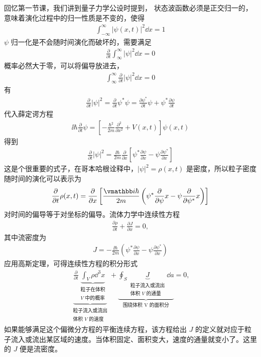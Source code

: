 回忆第一节课，我们讲到量子力学公设时提到，
状态波函数必须是正交归一的，意味着演化过程中的归一性质是不变的，使得
\begin{eqnarray}
    \int_{-\infty}^\infty |\psi(x,t)|^2 \dd x = 1
\end{eqnarray}
$\psi$ 归一化是不会随时间演化而破坏的，需要满足
\begin{eqnarray}
    \frac{\partial}{\partial t} \int_{\infty}^\infty |\psi|^2 \dd x = 0
\end{eqnarray}
概率必然大于零，可以将偏导放进去，
\begin{eqnarray}
    \int_{\infty}^\infty \frac{\partial}{\partial t}  |\psi|^2 \dd x = 0
\end{eqnarray}
有
\begin{eqnarray}
    \frac{\partial}{\partial t} |\psi|^2 = \frac{\partial}{\partial t} \psi^* \psi = \frac{\partial \psi^*}{\partial t}\psi + \psi^* \frac{\partial \psi}{\partial t}
\end{eqnarray}
代入薛定谔方程
\begin{eqnarray}
    \ii\hbar \frac{\partial}{\partial t} \psi = \left[
        -\frac{\hbar^2}{2m} \frac{\partial^2}{\partial x^2} + V(x,t)
    \right]
    \psi(x,t)
\end{eqnarray}
得到
\begin{eqnarray}
    \frac{\partial}{\partial t} |\psi|^2 = \frac{\ii\hbar}{2m} \frac{\partial}{\partial x}
    \left[
        \psi^* \frac{\partial \psi}{\partial x} - \psi \frac{\partial \psi^*}{\partial x}
    \right]
\end{eqnarray}
这是个很重要的式子，在哥本哈根诠释中，$|\psi|^2 = \rho(x,t)$ 是密度，所以粒子密度随时间的演化可以表示为
\begin{eqnarray}
    \pdv{t} \rho(x,t) = \pdv{x} \left[
        \frac{\ii\hbar}{2m} \left(
            \psi^* \pdv{\psi}x - \psi\pdv{\psi^*}x
        \right)
    \right]
\end{eqnarray}
对时间的偏导等于对坐标的偏导。流体力学中连续性方程
\begin{eqnarray}
    \frac{\partial \rho}{\partial t} + \frac{\partial J}{\partial x} = 0, 
\end{eqnarray}
其中流密度为
\begin{eqnarray}
    J = -\frac{\ii\hbar}{2m} \left( \psi^* \frac{\partial \psi}{\partial x} - \psi \frac{\partial \psi^*}{\partial x}\right)
\end{eqnarray}
应用高斯定理，可得连续性方程的积分形式
\begin{eqnarray}
    \underbrace{\frac{\partial}{\partial t} \underbrace{\int_V \rho \dd^3x}_{\substack{\text{粒子在体积} \\ \text{$V$ 中的概率}}} }_{\substack{\text{粒子流入或流出}\\ \text{体积 $V$ 的速度}}} 
     + 
    \underbrace{\oint_S \underbrace{J}_{\substack{\text{粒子流入或流出}\\ \text{体积 $V$ 的通量}}} \dd a}_{\text{围绕体积 V 的面积分}} = 0,
\end{eqnarray}
如果能够满足这个偏微分方程的平衡连续方程，该方程给出 $J$ 的定义就对应于粒子流入或流出某区域的速度。当体积固定、面积变大，速度的通量就变小了。这里的 $J$ 便是流密度。

